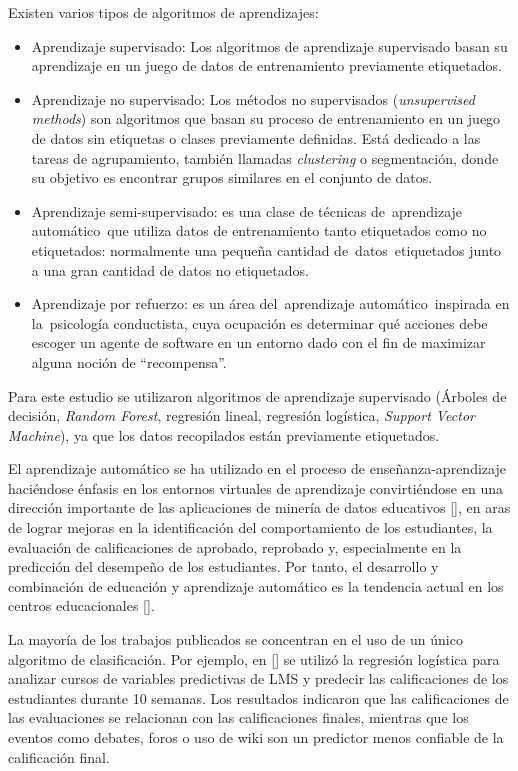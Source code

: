 Existen varios tipos de algoritmos de aprendizajes: 
\begin{itemize}
    \item Aprendizaje supervisado: Los algoritmos de aprendizaje supervisado basan su aprendizaje en un juego de datos de entrenamiento previamente etiquetados.
    \item Aprendizaje no supervisado: Los métodos no supervisados (\textit{unsupervised methods}) son algoritmos que basan su proceso de entrenamiento en un juego de datos sin etiquetas o clases previamente deﬁnidas. Está dedicado a las tareas de agrupamiento, también llamadas \textit{clustering} o segmentación, donde su objetivo es encontrar grupos similares en el conjunto de datos.
    \item Aprendizaje semi-supervisado: es una clase de técnicas de aprendizaje automático que utiliza datos de entrenamiento tanto etiquetados como no etiquetados: normalmente una pequeña cantidad de datos etiquetados junto a una gran cantidad de datos no etiquetados.
    \item Aprendizaje por refuerzo: es un área del aprendizaje automático inspirada en la psicología conductista, cuya ocupación es determinar qué acciones debe escoger un agente de software en un entorno dado con el fin de maximizar alguna noción de ``recompensa''.
\end{itemize}

Para este estudio se utilizaron algoritmos de aprendizaje supervisado (Árboles de decisión, \textit{Random Forest}, regresión lineal, regresión logística, \textit{Support Vector Machine}), ya que los datos recopilados están previamente etiquetados.  


El aprendizaje automático se ha utilizado en el proceso de enseñanza-aprendizaje haciéndose énfasis en los entornos virtuales de aprendizaje convirtiéndose en una dirección importante de las aplicaciones de minería de datos educativos [\cite{murad2018recommendation}], en aras de lograr mejoras en la identificación del comportamiento de los estudiantes, la evaluación de calificaciones de aprobado, reprobado y, especialmente en la predicción del desempeño de los estudiantes. Por tanto, el desarrollo y combinación de educación y aprendizaje automático es la tendencia actual en los centros educacionales [\cite{Suleiman}].  



La mayoría de los trabajos publicados se concentran en el uso de un único algoritmo de clasificación. Por ejemplo, en [\cite{conijn2016predicting}] se utilizó la regresión logística para analizar cursos de variables predictivas  de LMS y predecir las calificaciones de los estudiantes durante 10 semanas. Los resultados indicaron que las calificaciones de las evaluaciones se relacionan con las calificaciones finales, mientras que los eventos como debates, foros o uso de wiki son un predictor menos confiable de la calificación final.


